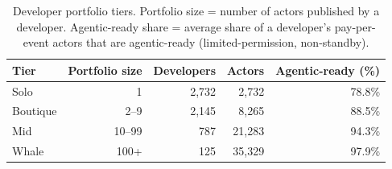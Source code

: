\begin{table}[t]
  \centering
  \caption{Developer portfolio tiers. Portfolio size = number of actors
    published by a developer. Agentic-ready share = average share of a
    developer's pay-per-event actors that are agentic-ready (limited-permission,
    non-standby).}
  \label{tab:dev_tiers}
  \small
  \begin{tabular}{l r r r r}
    \toprule
    \textbf{Tier} & \textbf{Portfolio size} & \textbf{Developers} & \textbf{Actors} & \textbf{Agentic-ready (\%)} \\
    \midrule
    Solo       & 1          & 2,732 & 2,732 & 78.8\% \\
    Boutique   & 2--9       & 2,145 & 8,265 & 88.5\% \\
    Mid        & 10--99     & 787 & 21,283 & 94.3\% \\
    Whale      & 100+       & 125 & 35,329 & 97.9\% \\
    \bottomrule
  \end{tabular}
\end{table}